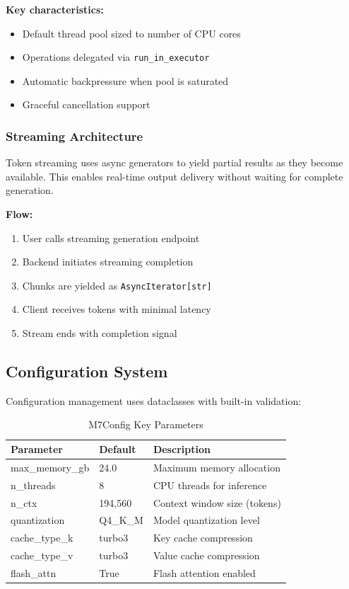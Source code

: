 \textbf{Key characteristics:}
\begin{itemize}
    \item Default thread pool sized to number of CPU cores
    \item Operations delegated via \texttt{run\_in\_executor}
    \item Automatic backpressure when pool is saturated
    \item Graceful cancellation support
\end{itemize}

\subsubsection{Streaming Architecture}

Token streaming uses async generators to yield partial results as they become available. This enables real-time output delivery without waiting for complete generation.

\textbf{Flow:}
\begin{enumerate}
    \item User calls streaming generation endpoint
    \item Backend initiates streaming completion
    \item Chunks are yielded as \texttt{AsyncIterator[str]}
    \item Client receives tokens with minimal latency
    \item Stream ends with completion signal
\end{enumerate}

\subsection{Configuration System}

Configuration management uses dataclasses with built-in validation:

\begin{table}[h]
\centering
\caption{M7Config Key Parameters}
\label{tab:config_params}
\begin{tabular}{lll}
\toprule
\textbf{Parameter} & \textbf{Default} & \textbf{Description} \\
\midrule
max\_memory\_gb & 24.0 & Maximum memory allocation \\
n\_threads & 8 & CPU threads for inference \\
n\_ctx & 194,560 & Context window size (tokens) \\
quantization & Q4\_K\_M & Model quantization level \\
cache\_type\_k & turbo3 & Key cache compression \\
cache\_type\_v & turbo3 & Value cache compression \\
flash\_attn & True & Flash attention enabled \\
\bottomrule
\end{tabular}
\end{table}

